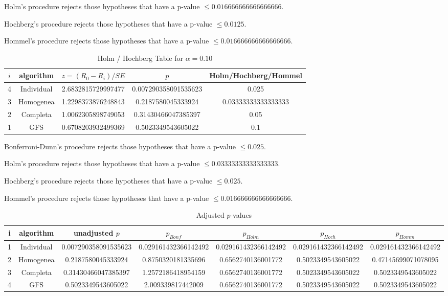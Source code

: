 \documentclass[a4paper,10pt]{article}
\begin{document}
\begin{landscape}
Holm's procedure rejects those hypotheses that have a p-value $\le0.016666666666666666$.


Hochberg's procedure rejects those hypotheses that have a p-value $\le0.0125$.


Hommel's procedure rejects those hypotheses that have a p-value $\le0.016666666666666666$.


\begin{table}[!htp]
\centering\tiny
\caption{Holm / Hochberg Table for $\alpha=0.10$}
\begin{tabular}{ccccc}
$i$&algorithm&$z=(R_0 - R_i)/SE$&$p$&Holm/Hochberg/Hommel\\
\hline
4&Individual&2.6832815729997477&0.007290358091535623&0.025\\
3&Homogenea&1.2298373876248843&0.2187580045333924&0.03333333333333333\\
2&Completa&1.0062305898749053&0.31430466047385397&0.05\\
1&GFS&0.6708203932499369&0.5023349543605022&0.1\\
\hline
\end{tabular}
\end{table}
Bonferroni-Dunn's procedure rejects those hypotheses that have a p-value $\le0.025$.


Holm's procedure rejects those hypotheses that have a p-value $\le0.03333333333333333$.


Hochberg's procedure rejects those hypotheses that have a p-value $\le0.025$.


Hommel's procedure rejects those hypotheses that have a p-value $\le0.016666666666666666$.


\begin{table}[!htp]
\centering\tiny
\caption{Adjusted $p$-values}
\begin{tabular}{ccccccc}
i&algorithm&unadjusted $p$&$p_{Bonf}$&$p_{Holm}$&$p_{Hoch}$&$p_{Homm}$\\
\hline
1&Individual&0.007290358091535623&0.029161432366142492&0.029161432366142492&0.029161432366142492&0.029161432366142492\\
2&Homogenea&0.2187580045333924&0.8750320181335696&0.6562740136001772&0.5023349543605022&0.47145699071078095\\
3&Completa&0.31430466047385397&1.2572186418954159&0.6562740136001772&0.5023349543605022&0.5023349543605022\\
4&GFS&0.5023349543605022&2.009339817442009&0.6562740136001772&0.5023349543605022&0.5023349543605022\\
\hline
\end{tabular}
\end{table}


\end{landscape}
\end{document}
